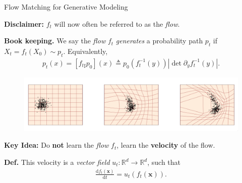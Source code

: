 \documentclass{beamer}
\begin{document}
\begin{frame}{Flow Matching for Generative Modeling \cite{lipmanFlowMatchingGenerative2023}}
    \begin{blackblock}
    \textbf{Disclaimer:} \( f_t \) will now often be referred to as the \emph{flow}.
    \end{blackblock}
    \textbf{Book keeping.} We say the \emph{flow} \( f_t \) \emph{generates} a probability path \( p_t \) if \( X_t = f_t(X_{0}) \sim p_t \). Equivalently,
    \begin{align*}
        p_t(x) = [f_{t\sharp}p_0](x) \triangleq  p_0(f_t^{-1}(y)) \left|\det \partial_y f_t^{-1}(y)\right|
    .\end{align*}
    \begin{figure}
        \centering
        \includegraphics[width=\linewidth]{figures/flow-vis.png}
    \end{figure}
\end{frame}
\begin{frame}
    \begin{blackblock}
    \textbf{Key Idea:} Do \textbf{not} learn the \emph{flow} \( f_t \), learn the \textbf{velocity} of the flow.
    \end{blackblock}
\textbf{Def.} This velocity is a \emph{vector field} \( u_t : \mathbb{R}^d \to \mathbb{R}^d \), such that
\begin{align*}
    \frac{\mathrm{d}f_t(\mathbf{x})}{\mathrm{d}t} = u_t(f_t(\mathbf{x}))
.\end{align*}
\end{frame}
\end{document}
